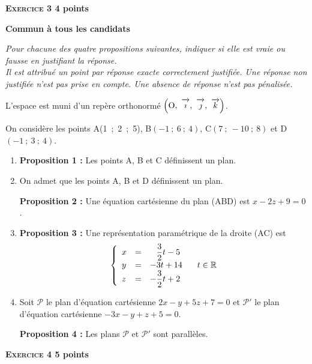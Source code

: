 \documentclass[10pt]{article}
\newcommand{\R}{\mathbb{R}}
\newcommand{\vect}[1]{\overrightarrow{\,\mathstrut#1\,}}
\def\Oijk{$\left(\text{O},~\vect{\imath},~\vect{\jmath},~\vect{k}\right)$}
\begin{document}
\vspace{0,5cm}

\textbf{\textsc{Exercice 3} \hfill 4 points}
 
\textbf{Commun à tous les candidats}

\medskip 

\emph{Pour chacune des quatre propositions suivantes, indiquer si elle est vraie ou fausse en justifiant la réponse.\\ 
Il est attribué un point par réponse exacte correctement justifiée. Une réponse non justifiée n'est pas prise en compte. Une absence de réponse n'est pas pénalisée.}

\medskip
 
L'espace est muni d'un repère orthonormé \Oijk.
 
On considère les points A(1~;~2~;~5), B$(-1~;~6~;~4)$, C$(7~;~- 10~;~8)$ et D$(-1~;~3~;~4)$.

\medskip
 
\begin{enumerate}
\item \textbf{Proposition 1 :} Les points A, B et C définissent un plan. 
\item On admet que les points A, B et D définissent un plan. 

\textbf{Proposition 2 :} Une équation cartésienne du plan (ABD) est $x - 2z + 9 = 0$. 
\item \textbf{Proposition 3 :} Une représentation paramétrique de la droite (AC) est 
\[\left\{\begin{array}{l c l} 
x &=& \phantom{-}\dfrac{3}{2}t - 5\\ 
y &=& - 3t + 14\\
z &=&- \dfrac{3}{2}t + 2
\end{array}\right. \quad  t \in \R\]
 
\item Soit $\mathcal{P}$ le plan d'équation cartésienne $2x - y + 5z + 7 = 0$ et $\mathcal{P}'$ le plan d'équation cartésienne $- 3x - y + z + 5 = 0$.
 
\textbf{Proposition 4 :} Les plans $\mathcal{P}$ et $\mathcal{P}'$ sont parallèles. 
\end{enumerate}



\vspace{0,5cm}

\textbf{\textsc{Exercice 4} \hfill 5 points}
 
\end{document}
